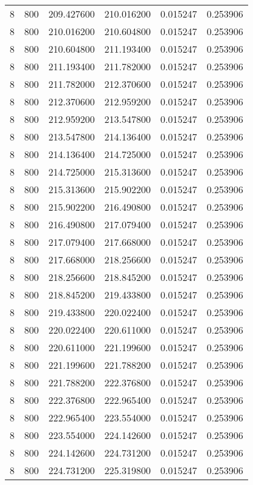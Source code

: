 \begin{longtable}{rrrrrr}
8 & 800 & 209.427600 & 210.016200 & 0.015247 & 0.253906 \\
8 & 800 & 210.016200 & 210.604800 & 0.015247 & 0.253906 \\
8 & 800 & 210.604800 & 211.193400 & 0.015247 & 0.253906 \\
8 & 800 & 211.193400 & 211.782000 & 0.015247 & 0.253906 \\
8 & 800 & 211.782000 & 212.370600 & 0.015247 & 0.253906 \\
8 & 800 & 212.370600 & 212.959200 & 0.015247 & 0.253906 \\
8 & 800 & 212.959200 & 213.547800 & 0.015247 & 0.253906 \\
8 & 800 & 213.547800 & 214.136400 & 0.015247 & 0.253906 \\
8 & 800 & 214.136400 & 214.725000 & 0.015247 & 0.253906 \\
8 & 800 & 214.725000 & 215.313600 & 0.015247 & 0.253906 \\
8 & 800 & 215.313600 & 215.902200 & 0.015247 & 0.253906 \\
8 & 800 & 215.902200 & 216.490800 & 0.015247 & 0.253906 \\
8 & 800 & 216.490800 & 217.079400 & 0.015247 & 0.253906 \\
8 & 800 & 217.079400 & 217.668000 & 0.015247 & 0.253906 \\
8 & 800 & 217.668000 & 218.256600 & 0.015247 & 0.253906 \\
8 & 800 & 218.256600 & 218.845200 & 0.015247 & 0.253906 \\
8 & 800 & 218.845200 & 219.433800 & 0.015247 & 0.253906 \\
8 & 800 & 219.433800 & 220.022400 & 0.015247 & 0.253906 \\
8 & 800 & 220.022400 & 220.611000 & 0.015247 & 0.253906 \\
8 & 800 & 220.611000 & 221.199600 & 0.015247 & 0.253906 \\
8 & 800 & 221.199600 & 221.788200 & 0.015247 & 0.253906 \\
8 & 800 & 221.788200 & 222.376800 & 0.015247 & 0.253906 \\
8 & 800 & 222.376800 & 222.965400 & 0.015247 & 0.253906 \\
8 & 800 & 222.965400 & 223.554000 & 0.015247 & 0.253906 \\
8 & 800 & 223.554000 & 224.142600 & 0.015247 & 0.253906 \\
8 & 800 & 224.142600 & 224.731200 & 0.015247 & 0.253906 \\
8 & 800 & 224.731200 & 225.319800 & 0.015247 & 0.253906 \\

\end{longtable}
